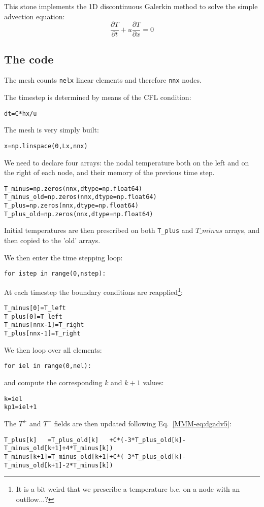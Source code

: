 

This stone implements the 1D discontinuous Galerkin method to solve the simple 
advection equation:
\[
\frac{\partial T}{\partial t} + u \frac{\partial T}{\partial x} = 0
\]




\subsection*{The code}

The mesh counts {\tt nelx} linear elements and therefore {\tt nnx} nodes.

The timestep is determined by means of the CFL condition:
\begin{lstlisting}
dt=C*hx/u
\end{lstlisting}
The mesh is very simply built:
\begin{lstlisting}
x=np.linspace(0,Lx,nnx)
\end{lstlisting}
We need to declare four arrays: the nodal temperature both on the left and 
on the right of each node, and their memory of the previous time step. 
\begin{lstlisting}
T_minus=np.zeros(nnx,dtype=np.float64)      
T_minus_old=np.zeros(nnx,dtype=np.float64)  
T_plus=np.zeros(nnx,dtype=np.float64)       
T_plus_old=np.zeros(nnx,dtype=np.float64)   
\end{lstlisting}
Initial temperatures are then prescribed on both {\tt T\_plus} 
and $T\_minus$ arrays, and then copied to the 'old' arrays.

We then enter the time stepping loop:
\begin{lstlisting}
for istep in range(0,nstep):
\end{lstlisting}
At each timestep the boundary conditions are reapplied\footnote{It is a bit weird that 
we prescribe a temperature b.c. on a node with an outflow...?}:
\begin{lstlisting}
T_minus[0]=T_left
T_plus[0]=T_left
T_minus[nnx-1]=T_right
T_plus[nnx-1]=T_right
\end{lstlisting}
We then loop over all elements:
\begin{lstlisting}
for iel in range(0,nel):
\end{lstlisting}
and compute the corresponding $k$ and $k+1$ values:
\begin{lstlisting}
k=iel
kp1=iel+1
\end{lstlisting}
The $T^+$ and $T^-$ fields are then updated following Eq.~\eqref{MMM-eq:dgadv5}:
\begin{lstlisting}
T_plus[k]   =T_plus_old[k]   +C*(-3*T_plus_old[k]-T_minus_old[k+1]+4*T_minus[k])
T_minus[k+1]=T_minus_old[k+1]+C*( 3*T_plus_old[k]-T_minus_old[k+1]-2*T_minus[k])
\end{lstlisting}







